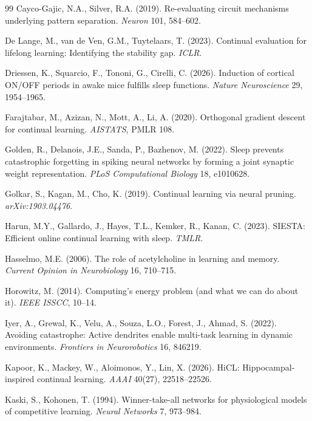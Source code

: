 \documentclass{article}
\begin{document}
\begin{thebibliography}{99}
 Cayco-Gajic, N.A., Silver, R.A. (2019). Re-evaluating circuit mechanisms underlying pattern separation. \emph{Neuron} 101, 584--602.

 De Lange, M., van de Ven, G.M., Tuytelaars, T. (2023). Continual evaluation for lifelong learning: Identifying the stability gap. \emph{ICLR}.

 Driessen, K., Squarcio, F., Tononi, G., Cirelli, C. (2026). Induction of cortical ON/OFF periods in awake mice fulfills sleep functions. \emph{Nature Neuroscience} 29, 1954--1965.

 Farajtabar, M., Azizan, N., Mott, A., Li, A. (2020). Orthogonal gradient descent for continual learning. \emph{AISTATS}, PMLR 108.

 Golden, R., Delanois, J.E., Sanda, P., Bazhenov, M. (2022). Sleep prevents catastrophic forgetting in spiking neural networks by forming a joint synaptic weight representation. \emph{PLoS Computational Biology} 18, e1010628.

 Golkar, S., Kagan, M., Cho, K. (2019). Continual learning via neural pruning. \emph{arXiv:1903.04476}.

 Harun, M.Y., Gallardo, J., Hayes, T.L., Kemker, R., Kanan, C. (2023). SIESTA: Efficient online continual learning with sleep. \emph{TMLR}.

 Hasselmo, M.E. (2006). The role of acetylcholine in learning and memory. \emph{Current Opinion in Neurobiology} 16, 710--715.

 Horowitz, M. (2014). Computing's energy problem (and what we can do about it). \emph{IEEE ISSCC}, 10--14.

 Iyer, A., Grewal, K., Velu, A., Souza, L.O., Forest, J., Ahmad, S. (2022). Avoiding catastrophe: Active dendrites enable multi-task learning in dynamic environments. \emph{Frontiers in Neurorobotics} 16, 846219.

 Kapoor, K., Mackey, W., Aloimonos, Y., Lin, X. (2026). HiCL: Hippocampal-inspired continual learning. \emph{AAAI} 40(27), 22518--22526.

 Kaski, S., Kohonen, T. (1994). Winner-take-all networks for physiological models of competitive learning. \emph{Neural Networks} 7, 973--984.


\end{thebibliography}
\end{document}
